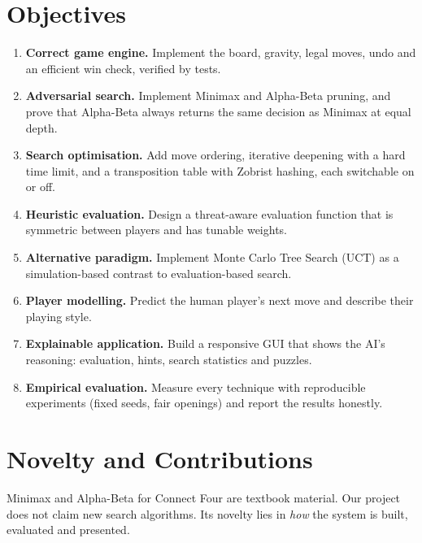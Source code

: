 \documentclass[11pt,a4paper]{article}
\begin{document}
\section{Objectives}\label{sec:objectives}

\begin{enumerate}[label=\textbf{O\arabic*.},leftmargin=2.2em]
  \item \textbf{Correct game engine.} Implement the board, gravity, legal moves, undo and an efficient win check, verified by tests.
  \item \textbf{Adversarial search.} Implement Minimax and Alpha-Beta pruning, and prove that Alpha-Beta always returns the same decision as Minimax at equal depth.
  \item \textbf{Search optimisation.} Add move ordering, iterative deepening with a hard time limit, and a transposition table with Zobrist hashing, each switchable on or off.
  \item \textbf{Heuristic evaluation.} Design a threat-aware evaluation function that is symmetric between players and has tunable weights.
  \item \textbf{Alternative paradigm.} Implement Monte Carlo Tree Search (UCT) as a simulation-based contrast to evaluation-based search.
  \item \textbf{Player modelling.} Predict the human player's next move and describe their playing style.
  \item \textbf{Explainable application.} Build a responsive GUI that shows the AI's reasoning: evaluation, hints, search statistics and puzzles.
  \item \textbf{Empirical evaluation.} Measure every technique with reproducible experiments (fixed seeds, fair openings) and report the results honestly.
\end{enumerate}

\section{Novelty and Contributions}\label{sec:novelty}

Minimax and Alpha-Beta for Connect Four are textbook material. Our project does not claim new search algorithms. Its novelty lies in \emph{how} the system is built, evaluated and presented.
\end{document}
